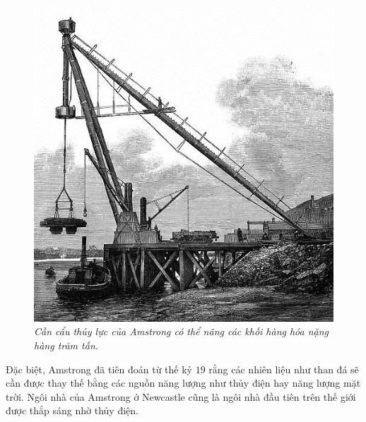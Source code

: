 \begin{multicols}{2}
\begin{figure}[H]
		\includegraphics[width= 1\linewidth]{28}
		\caption{\small\textit{\color{timhieukhoahoc}Cần cẩu thủy lực của Amstrong có thể nâng các khối hàng hóa nặng hàng trăm tấn.}}
		\vspace*{-10pt}
	\end{figure}
	Đặc biệt, Amstrong đã tiên đoán từ thế kỷ $19$ rằng các nhiên liệu như than đá sẽ cần được thay thế bằng các nguồn năng lượng như thủy điện hay năng lượng mặt trời. Ngôi nhà của Amstrong ở Newcastle cũng là ngôi nhà đầu tiên trên thế giới được thắp sáng nhờ thủy điện.
	\begin{figure}[H]
		\vspace*{-5pt}
		\centering
		\captionsetup{labelformat= empty, justification=centering}

\end{figure}
\end{multicols}
